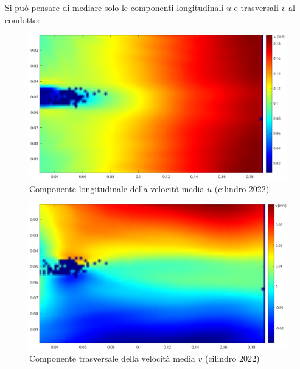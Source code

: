\noindent Si può pensare di mediare solo le componenti longitudinali $u$ e trasversali $v$ al condotto:
\begin{figure}[H]
    \centering
    \includegraphics[width=.92\textwidth]{images/11/Umean.png}
    \caption{Componente longitudinale della velocità media $u$ (cilindro 2022)}
\end{figure}

\begin{figure}[H]
    \centering
    \includegraphics[width=.8\textwidth]{images/11/vmean.png}
    \caption{Componente trasversale della velocità media $v$ (cilindro 2022)}
\end{figure}

